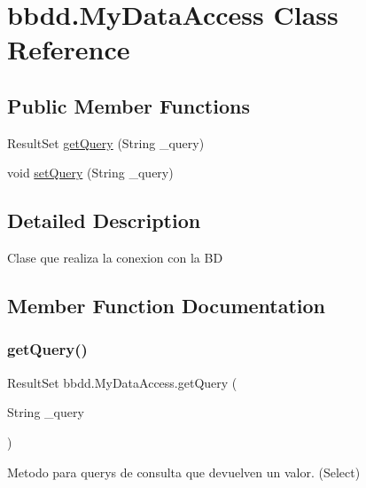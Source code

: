 \hypertarget{classbbdd_1_1_my_data_access}{}\section{bbdd.\+My\+Data\+Access Class Reference}
\label{classbbdd_1_1_my_data_access}
\subsection*{Public Member Functions}
\begin{DoxyCompactItemize}
\item 
Result\+Set \hyperlink{classbbdd_1_1_my_data_access_ac14ee2d3778d72e77d7f65dd90f4bfb4}{get\+Query} (String \+\_\+query)
\item 
void \hyperlink{classbbdd_1_1_my_data_access_abf21f22d79719fe19e9395d25b35b59b}{set\+Query} (String \+\_\+query)
\end{DoxyCompactItemize}


\subsection{Detailed Description}
Clase que realiza la conexion con la BD 

\subsection{Member Function Documentation}
\mbox{\label{classbbdd_1_1_my_data_access_ac14ee2d3778d72e77d7f65dd90f4bfb4}} 
\subsubsection{\texorpdfstring{get\+Query()}{getQuery()}}
{\footnotesize\ttfamily Result\+Set bbdd.\+My\+Data\+Access.\+get\+Query (\begin{DoxyParamCaption}\item[{String}]{\+\_\+query }\end{DoxyParamCaption})}

Metodo para querys de consulta que devuelven un valor. (Select) \mbox{\label{classbbdd_1_1_my_data_access_abf21f22d79719fe19e9395d25b35b59b}} 
